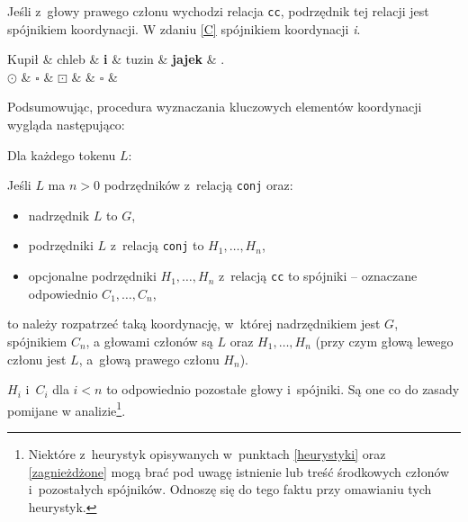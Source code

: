 Jeśli z~głowy prawego członu  wychodzi relacja \texttt{cc}, podrzędnik tej relacji jest spójnikiem koordynacji. W zdaniu \eqref{C} spójnikiem koordynacji \textit{i}.

\begin{exe}
\ex \label{C}
\begin{dependency}[baseline=0.9ex]
\begin{deptext}[column sep=1em, row sep=.1ex]
Kupił \& chleb \& \textbf{i} \& tuzin \& \textbf{jajek} \& .  \\ 
$\odot$ \& $\square$ \& \textbf{$\boxdot$} \& \& $\square$ \& \\ 
\end{deptext}
\end{dependency}
\end{exe}

Podsumowując, procedura wyznaczania kluczowych elementów koordynacji wygląda następująco:

\begin{exe}
\ex 	\label{procedura}
Dla każdego tokenu $L$:

Jeśli $L$ ma $n>0$ podrzędników z~relacją \texttt{conj} oraz:

\begin{itemize}
\item nadrzędnik $L$ to $G$,
\item podrzędniki $L$ z~relacją \texttt{conj} to $H_{1}, \ldots , H_{n}$,
\item opcjonalne podrzędniki $H_{1}, \ldots , H_{n}$ z~relacją \texttt{cc} to spójniki -- oznaczane odpowiednio $C_{1}, \ldots , C_{n}$,
\end{itemize}

to należy rozpatrzeć taką koordynację, w~której nadrzędnikiem jest $G$, spójnikiem $C_{n}$, a głowami członów są $L$ oraz $H_{1}, \ldots , H_{n}$ (przy czym głową lewego członu jest $L$, a~głową prawego członu $H_{n}$).
\end{exe}

$H_{i}$ i~$C_{i}$ dla $i<n$ to odpowiednio pozostałe głowy i~spójniki. Są one co do zasady pomijane w analizie\footnote{
Niektóre z~heurystyk opisywanych w~punktach \ref{heurystyki} oraz \ref{zagnieżdżone} mogą brać pod uwagę istnienie lub treść środkowych członów i~pozostałych spójników. Odnoszę się do tego faktu przy omawianiu tych heurystyk.}.

